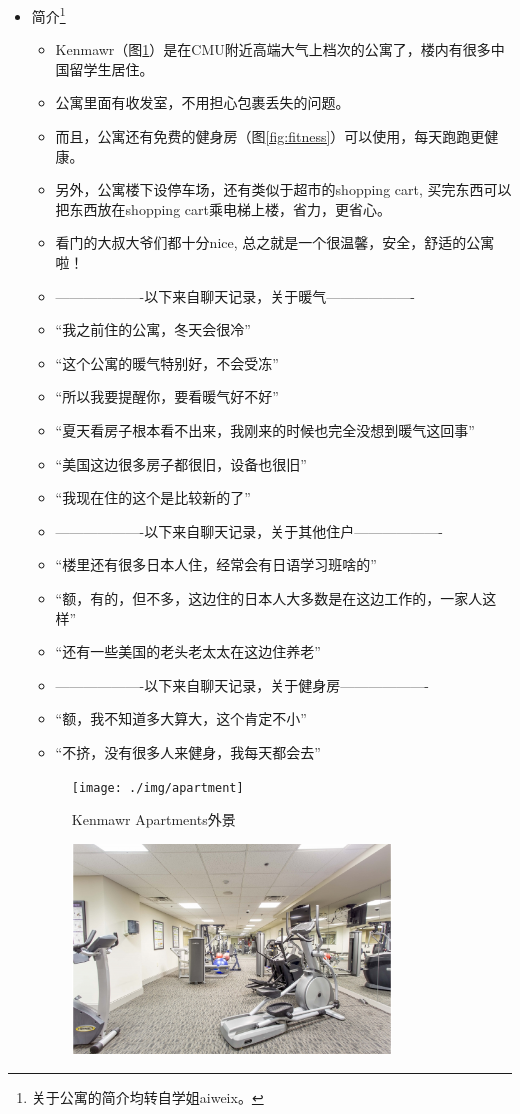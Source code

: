\documentclass[nofonts,a4paper,11pt]{article}
\begin{document}
\begin{itemize}
	\item 简介\footnote{关于公寓的简介均转自学姐aiweix。}
	\begin{itemize}
		\item Kenmawr（图\ref{fig:apartment}）是在CMU附近高端大气上档次的公寓了，楼内有很多中国留学生居住。
		\item 公寓里面有收发室，不用担心包裹丢失的问题。
		\item 而且，公寓还有免费的健身房（图\ref{fig:fitness}）可以使用，每天跑跑更健康。
		\item 另外，公寓楼下设停车场，还有类似于超市的shopping cart, 买完东西可以把东西放在shopping cart乘电梯上楼，省力，更省心。
		\item 看门的大叔大爷们都十分nice, 总之就是一个很温馨，安全，舒适的公寓啦！
		\item -------------------以下来自聊天记录，关于暖气-------------------
		\item “我之前住的公寓，冬天会很冷”
		\item “这个公寓的暖气特别好，不会受冻”
		\item “所以我要提醒你，要看暖气好不好”
		\item “夏天看房子根本看不出来，我刚来的时候也完全没想到暖气这回事”
		\item “美国这边很多房子都很旧，设备也很旧”
		\item “我现在住的这个是比较新的了”
		\item -------------------以下来自聊天记录，关于其他住户-------------------
		\item “楼里还有很多日本人住，经常会有日语学习班啥的”
		\item “额，有的，但不多，这边住的日本人大多数是在这边工作的，一家人这样”
		\item “还有一些美国的老头老太太在这边住养老”
		\item -------------------以下来自聊天记录，关于健身房-------------------
		\item “额，我不知道多大算大，这个肯定不小”
		\item “不挤，没有很多人来健身，我每天都会去”
	\end{itemize}
	\begin{figure}[!htb]
		\centering
		\texttt{[image: ./img/apartment]}
		\caption{Kenmawr Apartments外景}
		\label{fig:apartment}
	\end{figure}
	\begin{figure}[!htb]
		\centering
		\includegraphics[width=0.8\textwidth]{./img/fitness}

\end{figure}
\end{itemize}
\end{document}
